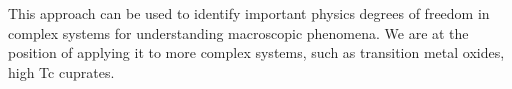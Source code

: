 \documentclass[aps, prb]{revtex4-1}
\begin{document}
This approach can be used to identify important physics degrees of freedom in complex systems for understanding macroscopic phenomena. We are at the position of applying it to more complex systems, such as transition metal oxides, high Tc cuprates. 
%


\end{document}
